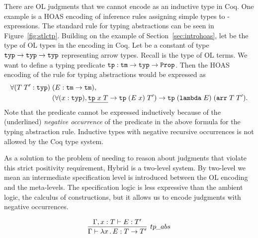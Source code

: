 There are OL judgments that we cannot encode as an inductive type in Coq. One example is a HOAS encoding of inference rules assigning simple types to \lambda-expressions.
The standard rule for typing abstractions can be seen in Figure~\ref{fig:stlctp}. Building on the example of Section~\ref{sec:introhoas}, let  be the type of OL types in the encoding in Coq. Let  be a constant of type $\texttt{typ} \rightarrow \texttt{typ} \rightarrow \texttt{typ}$ representing arrow types. Recall  is the type of OL terms.
We want to define a typing predicate $\texttt{tp} : \texttt{tm} \rightarrow \texttt{typ} \rightarrow \texttt{Prop}$. Then the HOAS encoding of the rule for typing abstractions would be expressed as
\begin{align*}
\forall (T \; T' : \texttt{typ}) \; & (E : \texttt{tm} \rightarrow \texttt{tm}), \\
& (\forall (x : \texttt{typ}), \underline{\texttt{tp} \; x \; T} \rightarrow \texttt{tp} \; (E \; x) \; T') \rightarrow \texttt{tp} \; (\texttt{lambda} \; E) \; (\texttt{arr} \; T \; T').
\end{align*}
Note that the  predicate cannot be expressed inductively because of the (underlined) \emph{negative occurrence} of the  predicate in the above formula for the typing abstraction rule. Inductive types with negative recursive occurrences is not allowed by the Coq type system.

As a solution to the problem of needing to reason about judgments that violate this strict positivity requirement, Hybrid is a two-level system. By two-level we mean an intermediate specification level is introduced between the OL encoding and the meta-levels. The specification logic is less expressive than the ambient logic, the calculus of constructions, but it allows us to encode judgments with negative occurrences.

\begin{figure}
$$
\inferH[tp\_abs]{\dyncon{} \vdash \lambda x \, . \, E : T \rightarrow T'}{\dyncon{} , x : T \vdash E : T'}
$$
\end{figure}

